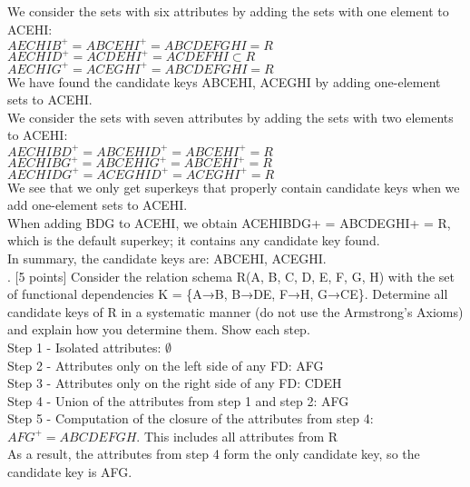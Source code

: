 \documentclass[]{article}
\begin{document}
	We consider the sets with six attributes by adding the sets with one element to ACEHI:  \\
	
	$AECHIB^{+} = ABCEHI^{+} = ABCDEFGHI = R$  \\
	
	$AECHID^{+} = ACDEHI^{+} = ACDEFHI \subset R$   \\
	
	$AECHIG^{+} = ACEGHI^{+} = ABCDEFGHI = R$  \\
	
	We have found the candidate keys ABCEHI, ACEGHI by adding one-element sets to ACEHI.  \\
	
	We consider the sets with seven attributes by adding the sets with two elements to ACEHI:  \\
	
	$AECHIBD^{+} = ABCEHID^{+} = ABCEHI^{+} = R$  \\
	
	$AECHIBG^{+} = ABCEHIG^{+} = ABCEHI^{+} = R$   \\
	
	$AECHIDG^{+} = ACEGHID^{+} = ACEGHI^{+} = R$  \\
	
	We see that we only get superkeys that properly contain candidate keys when we add one-element sets to ACEHI. \\
	
	When adding BDG to ACEHI, we obtain ACEHIBDG+ = ABCDEGHI+ = R, which is the default superkey; it contains any candidate key found.   \\
	
	In summary, the candidate keys are: ABCEHI, ACEGHI.  \\
	
	. [5 points] Consider the relation schema R(A, B, C, D, E, F, G, H) with the set of functional dependencies K = \{A→B, B→DE, F→H, G→CE\}. Determine all candidate keys of R in a systematic manner (do not use the Armstrong’s Axioms) and explain how you determine them. Show each step.     \\
	
	Step 1 - Isolated attributes: $\emptyset$  \\
	
	Step 2 - Attributes only on the left side of any FD: AFG   \\
	
	Step 3 - Attributes only on the right side of any FD: CDEH     \\
	
	Step 4 - Union of the attributes from step 1 and step 2: AFG   \\
	
	Step 5 - Computation of the closure of the attributes from step 4: $AFG^{+} = ABCDEFGH$. This includes all attributes from R  \\
	
	As a result, the attributes from step 4 form the only candidate key, so the candidate key is AFG.  \\
\end{document}
